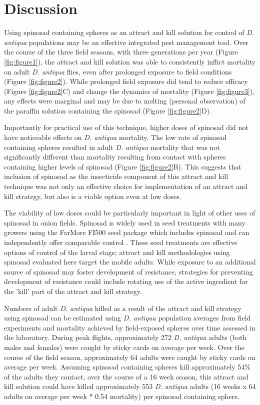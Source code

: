 \documentclass[num-refs]{wiley-article}
\begin{document}
\section{Discussion}

Using spinosad containing spheres as an attract and kill solution for control of \textit{D. antiqua} populations may be an effective integrated pest management tool.  Over the course of the three field seasons, with three generations per year (Figure \ref{fig:figure1}), the attract and kill solution was able to consistently inflict mortality on adult \textit{D. antiqua} flies, even after prolonged exposure to field conditions (Figure \ref{fig:figure2}).  While prolonged field exposure did tend to reduce efficacy (Figure \ref{fig:figure2}C) and change the dynamics of mortality (Figure \ref{fig:figure3}), any effects were marginal and may be due to melting (personal observation) of the paraffin solution containing the spinosad (Figure \ref{fig:figure2}D).  

Importantly for practical use of this technique, higher doses of spinosad did not have noticeable effects on \textit{D. antiqua} mortality.  The low rate of spinosad containing spheres resulted in adult \textit{D. antiqua} mortality that was not significantly different than mortality resulting from contact with spheres containing higher levels of spinosad (Figure \ref{fig:figure2}B).  This suggests that inclusion of spinosad as the insecticide component of this attract and kill technique was not only an effective choice for implementation of an attract and kill strategy, but also is a viable option even at low doses.  

The viability of low doses could be particularly important in light of other uses of spinosad in onion fields.  Spinosad is widely used in seed treatments with many growers using the FarMore FI500 seed package which includes spinosad and can independently offer comparable control \citep{nault2006performance,nault2006onion, wilson2015evaluation}.  These seed treatments are effective options of control of the larval stage; attract and kill methodologies using spinosad evaluated here target the mobile adults.  While exposure to an additional source of spinosad may foster development of resistance, strategies for preventing development of resistance could include rotating use of the active ingredient for the 'kill' part of the attract and kill strategy.   

Numbers of adult \textit{D. antiqua}  killed as a result of the attract and kill strategy using spinosad can be estimated using \textit{D. antiqua} population averages from field experiments and mortality achieved by field-exposed spheres over time assessed in the laboratory.  During peak flights, approximately 272 \textit{D. antiqua} adults (both males and females) were caught by sticky cards on average per week.  Over the course of the field season, approximately 64 adults were caught by sticky cards on average per week.  Assuming spinosad containing spheres kill approximately 54\% of the adults they contact, over the course of a 16 week season, this attract and kill solution could have killed approximately 553 \textit{D. antiqua} adults (16 weeks x 64 adults on average per week * 0.54 mortality) per spinosad containing sphere.  
\end{document}
